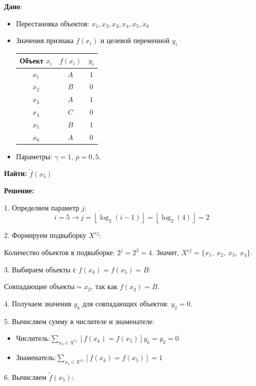 \textbf{Дано}:
\begin{itemize}
    \item Перестановка объектов: $x_1, x_2, x_3, x_4, x_5, x_6$
    \item Значения признака  $f(x_i)$ и целевой переменной $y_i$
    \begin{table}[h]
    \centering
    \begin{tabular}{c|c|c}
    Объект \( x_i \) & \( f(x_i) \) & \( y_i \) \\
    \hline
    \( x_1 \) & \( A \) & \( 1 \) \\
    \( x_2 \) & \( B \) & \( 0 \) \\
    \( x_3 \) & \( A \) & \( 1 \) \\
    \( x_4 \) & \( C \) & \( 0 \) \\
    \( x_5 \) & \( B \) & \( 1 \) \\
    \( x_6 \) & \( A \) & \( 0 \) \\
    \end{tabular}
    \end{table}
    \item Параметры: $\gamma = 1$, $p = 0{,}5$.
\end{itemize}

\textbf{Найти:} $\tilde{f}(x_5)$


\textbf{Решение:}

1. Определяем параметр $j$: 
$$
i = 5 \rightarrow j = \left\lfloor \log_2(i - 1) \right\rfloor = \left\lfloor \log_2(4) \right\rfloor = 2
$$

2. Формируем подвыборку $X^{rj}$:

   Количество объектов в подвыборке: $2^j = 2^2 = 4$. Значит, $X^{rj} = \{ x_1, \ x_2, \ x_3, \ x_4 \}$.

3. Выбираем объекты с \( f(x_k) = f(x_5) = B \):

   $\text{Совпадающие объекты} = x_2$, так как $f(x_2) = B$.

4. Получаем значения $y_k$ для совпадающих объектов: $y_2 = 0$.

5. Вычисляем сумму в числителе и знаменателе:
\begin{itemize}
   \item $\text{Числитель:} \sum\limits_{x_k \in X^{rj}} [f(x_k) = f(x_5)] y_k = y_2 = 0$
   \item $\text{Знаменатель:} \sum\limits_{x_k \in X^{rj}} [f(x_k) = f(x_5)] = 1$ 
\end{itemize}

6. Вычисляем $\tilde{f}(x_5)$:

